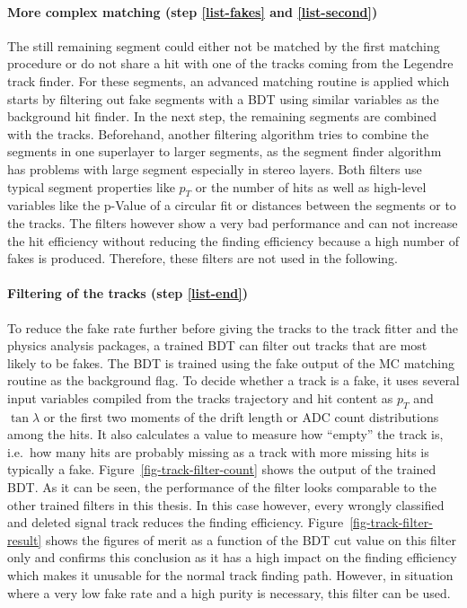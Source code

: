 \paragraph{More complex matching (step \ref{list-fakes} and \ref{list-second})}
The still remaining segment could either not be matched by the first matching procedure or do not share a hit with one of the tracks coming from the Legendre track finder. For these segments, an advanced matching routine is applied which starts by filtering out fake segments with a BDT using similar variables as the background hit finder. In the next step, the remaining segments are combined with the tracks. Beforehand, another filtering algorithm tries to combine the segments in one superlayer to larger segments, as the segment finder algorithm has problems with large segment especially in stereo layers. Both filters use typical segment properties like $p_T$ or the number of hits as well as high-level variables like the p-Value of a circular fit or distances between the segments or to the tracks. The filters however show a very bad performance and can not increase the hit efficiency without reducing the finding efficiency because a high number of fakes is produced. Therefore, these filters are not used in the following. 

\paragraph{Filtering of the tracks (step \ref{list-end})}
To reduce the fake rate further before giving the tracks to the track fitter and the physics analysis packages, a trained BDT can filter out tracks that are most likely to be fakes. The BDT is trained using the fake output of the MC matching routine as the background flag. To decide whether a track is a fake, it uses several input variables compiled from the tracks trajectory and hit content as $p_T$ and $\tan \lambda$ or the first two moments of the drift length or ADC count distributions among the hits. It also calculates a value to measure how ``empty'' the track is, i.e.\ how many hits are probably missing as a track with more missing hits is typically a fake. Figure~\ref{fig-track-filter-count} shows the output of the trained BDT. As it can be seen, the performance of the filter looks comparable to the other trained filters in this thesis. In this case however, every wrongly classified and deleted signal track reduces the finding efficiency. Figure~\ref{fig-track-filter-result} shows the figures of merit as a function of the BDT cut value on this filter only and confirms this conclusion as it has a high impact on the finding efficiency which makes it unusable for the normal track finding path. However, in situation where a very low fake rate and a high purity is necessary, this filter can be used.

